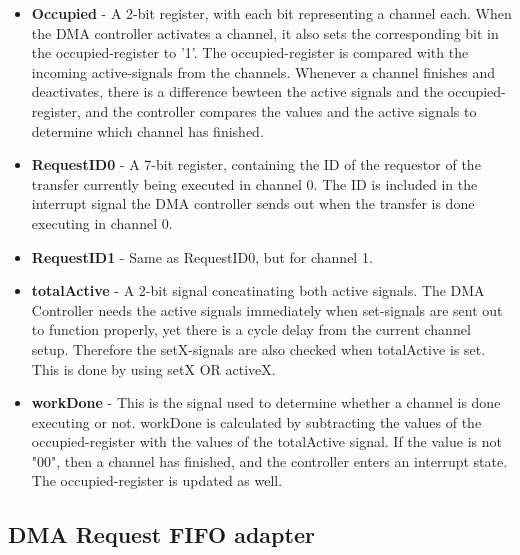 \begin{itemize}
    \item \textbf{Occupied} - A 2-bit register, with each bit representing a channel each.
    When the DMA controller activates a channel, it also sets the corresponding bit in the occupied-register to '1'.
    The occupied-register is compared with the incoming active-signals from the channels.
    Whenever a channel finishes and deactivates, there is a difference bewteen the active signals and the occupied-register, and the controller compares the values and the active signals to determine which channel has finished.
    \item \textbf{RequestID0} - A 7-bit register, containing the ID of the requestor of the transfer currently being executed in channel 0.
    The ID is included in the interrupt signal the DMA controller sends out when the transfer is done executing in channel 0.
    \item \textbf{RequestID1} - Same as RequestID0, but for channel 1.
    \item \textbf{totalActive} - A 2-bit signal concatinating both active signals.
    The DMA Controller needs the active signals immediately when set-signals are sent out to function properly, yet there is a cycle delay from the current channel setup.
    Therefore the setX-signals are also checked when totalActive is set.
    This is done by using setX OR activeX.
    \item \textbf{workDone} - This is the signal used to determine whether a channel is done executing or not.
    workDone is calculated by subtracting the values of the occupied-register with the values of the totalActive signal.
    If the value is not "00", then a channel has finished, and the controller enters an interrupt state.
    The occupied-register is updated as well.
\end{itemize}

\subsection{DMA Request FIFO adapter}

